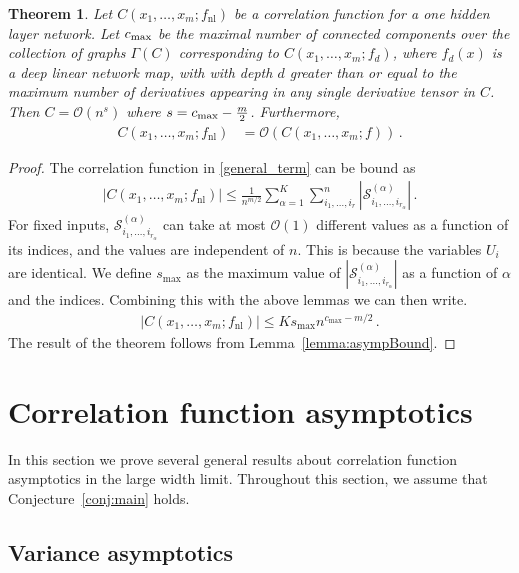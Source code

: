 \documentclass[english]{article}
\newtheorem{thm}{Theorem}
\newcommand{\cO}{\ensuremath{\mathcal{O}}}
\newcommand{\fnl}{f_{\mathrm{nl}}}
\begin{document}
\begin{thm}\label{thrm:nl_scaling}
Let $C(x_1,\dots,x_m;\fnl)$ be a correlation function for a one hidden layer network.
Let $c_{\rm max}$  be the maximal number of connected components over the collection of graphs $\Gamma(C)$ corresponding to $C(x_1,\dots,x_m;f_d)$, where $f_d(x)$ is a deep linear network map, with 
with depth $d$ greater than or equal to the maximum number of derivatives appearing in any single derivative tensor in $C$.
Then $C = \cO(n^s)$ where $s = c_{\rm max} - \frac{m}{2}$. Furthermore,
  \begin{align}
    C(x_1,\dots,x_m;\fnl) &= \cO(C(x_1,\dots,x_m;f)) \,.
  \end{align}
\end{thm}
\begin{proof}
  The correlation function in \eqref{general_term} can be bound as
  \begin{align}
    |C(x_1,\dots,x_m;\fnl)| \le
    \frac{1}{n^{m/2}}
    \sum_{\alpha=1}^{K}\sum_{i_1,\ldots,i_r}^{n} \left| \mathcal{S}^{(\alpha)}_{i_{1},\ldots,i_{r_{\alpha}}} \right| \,.
    \label{termbound}
  \end{align}
  For fixed inputs, $\mathcal{S}_{i_{1},\ldots,i_{r_{\alpha}}}^{(\alpha)}$ can take at most $\cO(1)$ different values as a function of its indices, and the values are independent of $n$.
This is because the variables $U_i$ are identical.
We define $s_{\textrm{max}}$ as the maximum value of $|\mathcal{S}_{i_{1},\ldots,i_{r_{\alpha}}}^{(\alpha)}|$ as a function of $\alpha$ and the indices. Combining this with the above lemmas we can then write.
  \begin{align}
    |C(x_1,\dots,x_m;\fnl)| \leq Ks_{\textrm{max}} n^{c_{\textrm{max}}-m/2} \,.
    \label{termbound}
  \end{align}
  The result of the theorem follows from Lemma~\ref{lemma:asympBound}.
\end{proof}


\section{Correlation function asymptotics}
\label{app:asymp}

In this section we prove several general results about correlation function asymptotics in the large width limit.
Throughout this section, we assume that Conjecture~\ref{conj:main} holds.


\subsection{Variance asymptotics}
\end{document}
